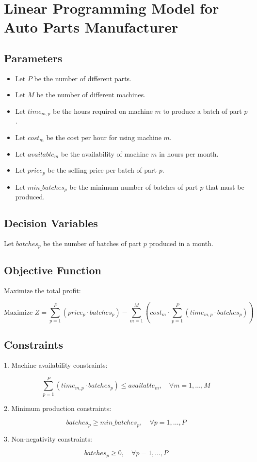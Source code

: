 \documentclass{article}
\begin{document}
\section*{Linear Programming Model for Auto Parts Manufacturer}

\subsection*{Parameters}
\begin{itemize}
    \item Let \( P \) be the number of different parts.
    \item Let \( M \) be the number of different machines.
    \item Let \( time_{m,p} \) be the hours required on machine \( m \) to produce a batch of part \( p \).
    \item Let \( cost_{m} \) be the cost per hour for using machine \( m \).
    \item Let \( available_{m} \) be the availability of machine \( m \) in hours per month.
    \item Let \( price_{p} \) be the selling price per batch of part \( p \).
    \item Let \( min\_batches_{p} \) be the minimum number of batches of part \( p \) that must be produced.
\end{itemize}

\subsection*{Decision Variables}
Let \( batches_{p} \) be the number of batches of part \( p \) produced in a month.

\subsection*{Objective Function}
Maximize the total profit:

\[
\text{Maximize } Z = \sum_{p=1}^{P} (price_{p} \cdot batches_{p}) - \sum_{m=1}^{M} (cost_{m} \cdot \sum_{p=1}^{P} (time_{m,p} \cdot batches_{p}))
\]

\subsection*{Constraints}
1. Machine availability constraints:

\[
\sum_{p=1}^{P} (time_{m,p} \cdot batches_{p}) \leq available_{m}, \quad \forall m = 1, \ldots, M
\]

2. Minimum production constraints:

\[
batches_{p} \geq min\_batches_{p}, \quad \forall p = 1, \ldots, P
\]

3. Non-negativity constraints:

\[
batches_{p} \geq 0, \quad \forall p = 1, \ldots, P
\]
\end{document}
